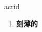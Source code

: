 
\begin{frame}
{\huge acrid}
\begin{center}
\begin{enumerate}\Large
  \item \textbf{刻薄的}
\end{enumerate}
\end{center}
\end{frame}
